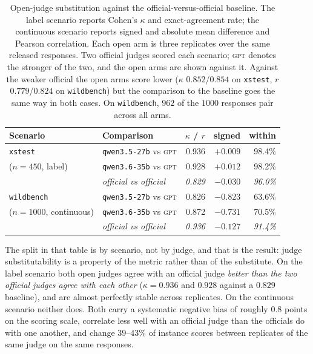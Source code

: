 \begin{table}[t]
\caption{Open-judge substitution against the official-versus-official baseline.
The label scenario reports Cohen's $\kappa$ and exact-agreement rate; the
continuous scenario reports signed and absolute mean difference and Pearson
correlation. Each open arm is three replicates over the same released responses.
Two official judges scored each scenario; \textsc{gpt} denotes the stronger of the
two, and the open arms are shown against it. Against the weaker official the open
arms score lower ($\kappa$ $0.852$/$0.854$ on \texttt{xstest}, $r$
$0.779$/$0.824$ on \texttt{wildbench}) but the comparison to the baseline goes the
same way in both cases. On \texttt{wildbench}, $962$ of the $1000$ responses pair
across all arms.}
\label{tab:openjudge}
\begin{center}
\small
\begin{tabular}{llrrr}
\toprule
\textbf{Scenario} & \textbf{Comparison} & \textbf{$\kappa$ / $r$} & \textbf{signed} & \textbf{within} \\
\midrule
\texttt{xstest}    & \texttt{qwen3.5-27b} vs \textsc{gpt} & 0.936 & $+0.009$ & 98.4\% \\
($n{=}450$, label) & \texttt{qwen3.6-35b} vs \textsc{gpt} & 0.928 & $+0.012$ & 98.2\% \\
                   & \emph{official vs official}      & \emph{0.829} & $-0.030$ & \emph{96.0\%} \\
\midrule
\texttt{wildbench}      & \texttt{qwen3.5-27b} vs \textsc{gpt} & 0.826 & $-0.823$ & 63.6\% \\
($n{=}1000$, continuous)& \texttt{qwen3.6-35b} vs \textsc{gpt} & 0.872 & $-0.731$ & 70.5\% \\
                        & \emph{official vs official}      & \emph{0.936} & $-0.127$ & \emph{91.4\%} \\
\bottomrule
\end{tabular}
\end{center}
\end{table}

The split in that table is by scenario, not by judge, and that is the result:
judge substitutability is a property of the metric rather than of the substitute.
On the label scenario both open judges agree with an official judge \emph{better
than the two official judges agree with each other} ($\kappa = 0.936$ and $0.928$
against a $0.829$ baseline), and are almost perfectly stable across replicates. On
the continuous scenario neither does. Both carry a systematic negative bias of
roughly $0.8$ points on the scoring scale, correlate less well with an official
judge than the officials do with one another, and change $39$--$43\%$ of instance
scores between replicates of the same judge on the same responses.

